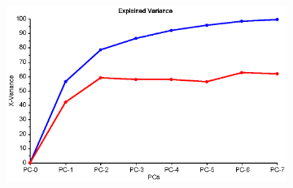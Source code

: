 \begin{figure}[h]
\begin{subfigure}[t]{0.48\textwidth}
 		\caption{}
 		\label{}
 	\end{subfigure}
 	\begin{subfigure}[t]{0.48\textwidth}
 		\centering
 		\includegraphics[width=\textwidth]{figurer/politikk-pca-ev}
 		\caption{}
 		\label{}
 	\end{subfigure}
	\label{fig:politikk-pca}
 \end{figure}
 

